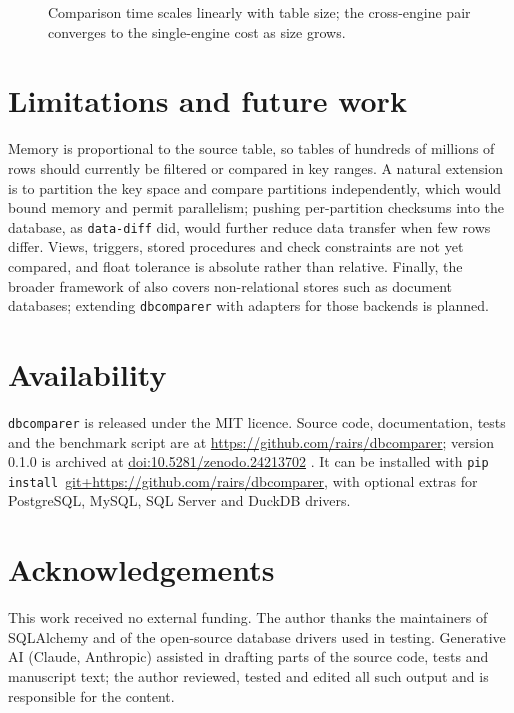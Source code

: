 \documentclass[11pt]{article}
\begin{document}
\begin{figure}[t]
\centering
{}
\caption{Comparison time scales linearly with table size; the cross-engine
pair converges to the single-engine cost as size grows.}
\label{fig:perf}
\end{figure}

\section{Limitations and future work}

Memory is proportional to the source table, so tables of hundreds of
millions of rows should currently be filtered or compared in key ranges. A
natural extension is to partition the key space and compare partitions
independently, which would bound memory and permit parallelism; pushing
per-partition checksums into the database, as \texttt{data-diff} did,
would further reduce data transfer when few rows differ. Views, triggers,
stored procedures and check constraints are not yet compared, and float
tolerance is absolute rather than relative. Finally, the broader framework
of \citet{rai2026universal} also covers non-relational stores such as
document databases; extending \texttt{dbcomparer} with adapters for those
backends is planned.

\section{Availability}

\texttt{dbcomparer} is released under the MIT licence. Source code,
documentation, tests and the benchmark script are at
\url{https://github.com/rairs/dbcomparer}; version 0.1.0 is archived at
\href{https://doi.org/10.5281/zenodo.24213702}{doi:10.5281/zenodo.24213702}
\citep{dbcomparer_zenodo}. It can be installed with
\texttt{pip install}\ \url{git+https://github.com/rairs/dbcomparer}, with optional
extras for PostgreSQL, MySQL, SQL Server and DuckDB drivers.

\section*{Acknowledgements}

This work received no external funding. The author thanks the maintainers
of SQLAlchemy and of the open-source database drivers used in testing.
Generative AI (Claude, Anthropic) assisted in drafting parts of the source
code, tests and manuscript text; the author reviewed, tested and edited all
such output and is responsible for the content.



\end{document}
